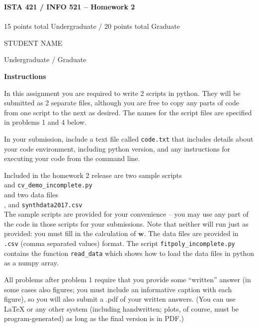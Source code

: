 \documentclass[10pt]{article}
\newcommand{\latex}{\LaTeX\xspace}
\begin{document}
\begin{center}
    {\Large {\bf ISTA 421 / INFO 521 -- Homework 2}} \\
     \\
    15 points total Undergraduate / 20 points total Graduate

\end{center}

\begin{flushright}
STUDENT NAME %

Undergraduate / Graduate %
\end{flushright}


\vspace{1cm}
{\Large {\bf Instructions}}

In this assignment you are required to write 2 scripts in python.  They will be submitted as 2 separate files, although you are free to copy any parts of code from one script to the next as desired.  The names for the script files are specified in problems 1 and 4 below.

In your submission, include a text file called {\tt code.txt} that includes details about your code environment, including python version, and any instructions for executing your code from the command line.

Included in the homework 2 release are two sample scripts \\ 
\-\hspace{2cm}{\tt fitpoly\_incomplete.py} and {\tt cv\_demo\_incomplete.py} \\
and two data files\\
\-\hspace{2cm}{\tt womens100.csv}, and {\tt synthdata2017.csv}\\
The sample scripts are provided for your convenience -- you may use any part of the code in those scripts for your submissions.  Note that neither will run just as provided: you must fill in the calculation of $\mathbf{w}$.  The data files are provided in {\tt .csv} (comma separated values) format.  The script {\tt fitpoly\_incomplete.py} contains the function {\tt read\_data} which shows how to load the data files in python as a numpy array.

All problems after problem 1 require that you provide some ``written'' answer (in some cases also figures; you must include an informative caption with each figure), so you will also submit a .pdf of your written answers.  (You can use \latex or any other system (including handwritten; plots, of course, must be program-generated) as long as the final version is in PDF.)
\end{document}

